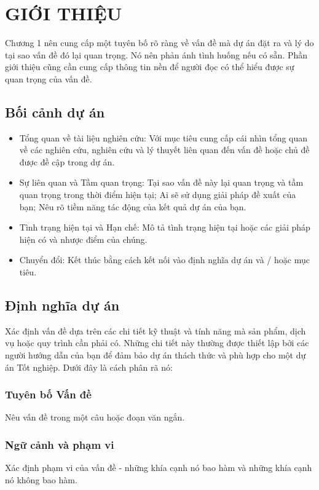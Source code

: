 \chapter{GIỚI THIỆU}

Chương 1 nên cung cấp một tuyên bố rõ ràng về vấn đề mà dự án đặt ra và lý do tại sao vấn đề đó lại quan trọng. Nó nên phản ánh tình huống nếu có sẵn. Phần giới thiệu cũng cần cung cấp thông tin nền để người đọc có thể hiểu được sự quan trọng của vấn đề.

\section{Bối cảnh dự án}

\begin{itemize}
\item Tổng quan về tài liệu nghiên cứu: Với mục tiêu cung cấp cái nhìn tổng quan về các nghiên cứu, nghiên cứu và lý thuyết liên quan đến vấn đề hoặc chủ đề được đề cập trong dự án.

\item Sự liên quan và Tầm quan trọng: Tại sao vấn đề này lại quan trọng và tầm quan trọng trong thời điểm hiện tại; Ai sẽ sử dụng giải pháp đề xuất của bạn; Nêu rõ tiềm năng tác động của kết quả dự án của bạn.

\item Tình trạng hiện tại và Hạn chế: Mô tả tình trạng hiện tại hoặc các giải pháp hiện có và nhược điểm của chúng.

\item Chuyển đổi: Kết thúc bằng cách kết nối vào định nghĩa dự án và / hoặc mục tiêu.
\end{itemize}

\section{Định nghĩa dự án}
Xác định vấn đề dựa trên các chi tiết kỹ thuật và tính năng mà sản phẩm, dịch vụ hoặc quy trình cần phải có. Những chi tiết này thường được thiết lập bởi các người hướng dẫn của bạn để đảm bảo dự án thách thức và phù hợp cho một dự án Tốt nghiệp. Dưới đây là cách phân rã nó:

\subsection{Tuyên bố Vấn đề} 
Nêu vấn đề trong một câu hoặc đoạn văn ngắn.

\subsection{Ngữ cảnh và phạm vi}
Xác định phạm vi của vấn đề - những khía cạnh nó bao hàm và những khía cạnh nó không bao hàm.


